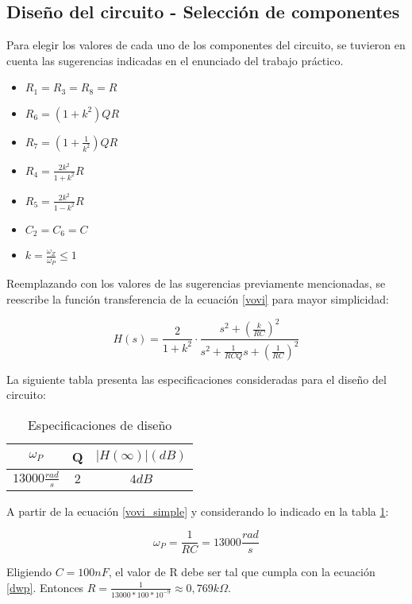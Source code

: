 \subsection{Dise\~no del circuito - Selecci\'on de componentes}
Para elegir los valores de cada uno de los componentes del circuito, se tuvieron en cuenta las sugerencias indicadas en el enunciado del trabajo pr\'actico.

\begin{itemize}
	\item $R_1 = R_3 = R_8 = R$
	\item $R_6 = (1 + k^2) Q R$
	\item $R_7 = (1 + \frac{1}{k^2})Q R$
	\item $R_4 = \frac{2k^2}{1+k^2}R$
	\item $R_5 = \frac{2k^2}{1-k^2}R$
	\item $C_2 = C_6 = C$
	\item $k = \frac{\omega_Z}{\omega_P} \leqslant 1 $
\end{itemize}

Reemplazando con los valores de las sugerencias previamente mencionadas, se reescribe la funci\'on transferencia de la ecuaci\'on \ref{vovi} para mayor simplicidad:

\begin{equation}
	H(s) = \frac{2}{1+k^2} \cdot \frac{s^2 + \left( \frac{k}{RC}\right)^2}{s^2 + \frac{1}{RCQ} s + \left(\frac{1}{RC}\right)^2}
	\label{vovi_simple}
\end{equation}


La siguiente tabla presenta las especificaciones consideradas para el dise\~no del circuito:

\begin{table}[h!]
	\centering
	\begin{tabular}{c c c}%
		\bfseries $\omega_P$ & Q & $|H(\infty)| (dB)$ \\ \hline
		$13000 \frac{rad}{s}$ & $2$ & $4dB$\\
		\hline
	\end{tabular}
	\caption{Especificaciones de dise\~no}
	\label{especificaciones}
\end{table}

A partir de la ecuaci\'on \ref{vovi_simple} y considerando lo indicado en la tabla \ref{especificaciones}:

\begin{equation}
	\omega_P = \frac{1}{RC} = 13000\frac{rad}{s}
	\label{dwp}
\end{equation}

Eligiendo $C = 100nF$, el valor de R debe ser tal que cumpla con la ecuaci\'on \ref{dwp}. Entonces $R = \frac{1}{13000 * 100 *10^{-9}} \approx 0,769k\Omega.$



